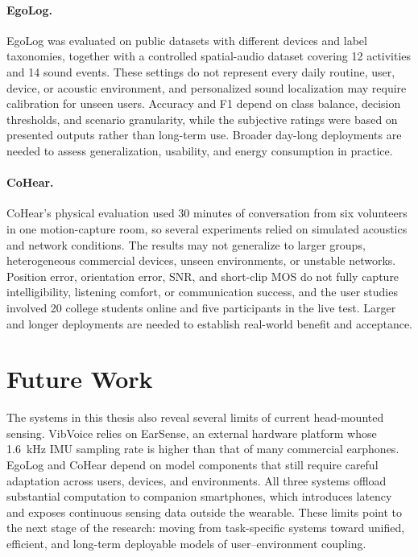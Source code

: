 \documentclass[11pt]{gsasthesis} %
\begin{document}
\paragraph{EgoLog.}
EgoLog was evaluated on public datasets with different devices and label taxonomies, together with a controlled spatial-audio dataset covering 12 activities and 14 sound events. These settings do not represent every daily routine, user, device, or acoustic environment, and personalized sound localization may require calibration for unseen users. Accuracy and F1 depend on class balance, decision thresholds, and scenario granularity, while the subjective ratings were based on presented outputs rather than long-term use. Broader day-long deployments are needed to assess generalization, usability, and energy consumption in practice.

\paragraph{CoHear.}
CoHear's physical evaluation used 30 minutes of conversation from six volunteers in one motion-capture room, so several experiments relied on simulated acoustics and network conditions. The results may not generalize to larger groups, heterogeneous commercial devices, unseen environments, or unstable networks. Position error, orientation error, SNR, and short-clip MOS do not fully capture intelligibility, listening comfort, or communication success, and the user studies involved 20 college students online and five participants in the live test. Larger and longer deployments are needed to establish real-world benefit and acceptance.

\section{Future Work}

The systems in this thesis also reveal several limits of current head-mounted sensing. VibVoice relies on EarSense, an external hardware platform whose 1.6~kHz IMU sampling rate is higher than that of many commercial earphones. EgoLog and CoHear depend on model components that still require careful adaptation across users, devices, and environments. All three systems offload substantial computation to companion smartphones, which introduces latency and exposes continuous sensing data outside the wearable. These limits point to the next stage of the research: moving from task-specific systems toward unified, efficient, and long-term deployable models of user--environment coupling.
\end{document}
